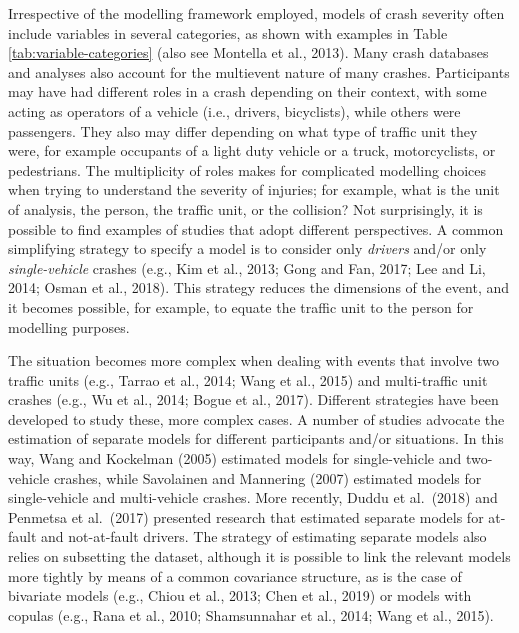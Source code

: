 \documentclass[]{elsarticle} %
\begin{document}
Irrespective of the modelling framework employed, models of crash
severity often include variables in several categories, as shown with
examples in Table \ref{tab:variable-categories} (also see Montella et
al., 2013). Many crash databases and analyses also account for the
multievent nature of many crashes. Participants may have had different
roles in a crash depending on their context, with some acting as
operators of a vehicle (i.e., drivers, bicyclists), while others were
passengers. They also may differ depending on what type of traffic unit
they were, for example occupants of a light duty vehicle or a truck,
motorcyclists, or pedestrians. The multiplicity of roles makes for
complicated modelling choices when trying to understand the severity of
injuries; for example, what is the unit of analysis, the person, the
traffic unit, or the collision? Not surprisingly, it is possible to find
examples of studies that adopt different perspectives. A common
simplifying strategy to specify a model is to consider only
\emph{drivers} and/or only \emph{single-vehicle} crashes (e.g., Kim et
al., 2013; Gong and Fan, 2017; Lee and Li, 2014; Osman et al., 2018).
This strategy reduces the dimensions of the event, and it becomes
possible, for example, to equate the traffic unit to the person for
modelling purposes.

The situation becomes more complex when dealing with events that involve
two traffic units (e.g., Tarrao et al., 2014; Wang et al., 2015) and
multi-traffic unit crashes (e.g., Wu et al., 2014; Bogue et al., 2017).
Different strategies have been developed to study these, more complex
cases. A number of studies advocate the estimation of separate models
for different participants and/or situations. In this way, Wang and
Kockelman (2005) estimated models for single-vehicle and two-vehicle
crashes, while Savolainen and Mannering (2007) estimated models for
single-vehicle and multi-vehicle crashes. More recently, Duddu et
al.~(2018) and Penmetsa et al.~(2017) presented research that estimated
separate models for at-fault and not-at-fault drivers. The strategy of
estimating separate models also relies on subsetting the dataset,
although it is possible to link the relevant models more tightly by
means of a common covariance structure, as is the case of bivariate
models (e.g., Chiou et al., 2013; Chen et al., 2019) or models with
copulas (e.g., Rana et al., 2010; Shamsunnahar et al., 2014; Wang et
al., 2015).
\end{document}
